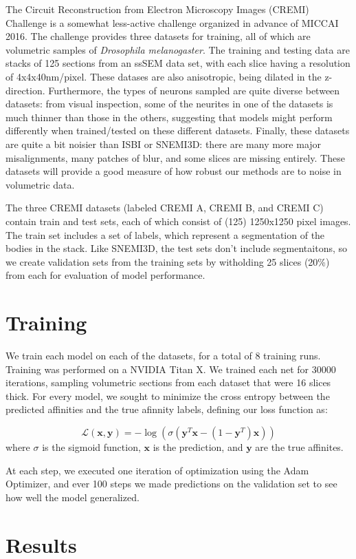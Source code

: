The Circuit Reconstruction from Electron Microscopy Images (CREMI) Challenge is a somewhat less-active challenge organized in advance of MICCAI 2016\cite{Funke.Jan2016}. The challenge provides three datasets for training, all of which are volumetric samples of \textit{Drosophila melanogaster}. The training and testing data are stacks of 125 sections from an ssSEM data set, with each slice having a resolution of 4x4x40nm/pixel. These datases are also anisotropic, being dilated in the z-direction. Furthermore, the types of neurons sampled are quite diverse between datasets: from visual inspection, some of the neurites in one of the datasets is much thinner than those in the others, suggesting that models might perform differently when trained/tested on these different datasets. Finally, these datasets are quite a bit noisier than ISBI or SNEMI3D: there are many more major misalignments, many patches of blur, and some slices are missing entirely. These datasets will provide a good measure of how robust our methods are to noise in volumetric data.

The three CREMI datasets (labeled CREMI A, CREMI B, and CREMI C) contain train and test sets, each of which consist of (125) 1250x1250 pixel images. The train set includes a set of labels, which represent a segmentation of the bodies in the stack. Like SNEMI3D, the test sets don't include segmentaitons, so we create validation sets from the training sets by witholding 25 slices (20\%) from each for evaluation of model performance.

\section{Training}

We train each model on each of the datasets, for a total of 8 training runs. Training was performed on a NVIDIA Titan X. We trained each net for 30000 iterations, sampling volumetric sections from each dataset that were 16 slices thick. For every model, we sought to minimize the cross entropy between the predicted affinities and the true afinnity labels, defining our loss function as:

$$\mathcal{L}(\bm{x}, \bm{y}) =-\log(\sigma(\bm{y}^{T}\bm{x}-(1-\bm{y}^{T})\bm{x}))$$
where $\sigma$ is the sigmoid function, $\bm{x}$ is the prediction, and $\bm{y}$ are the true affinites.

At each step, we executed one iteration of optimization using the Adam Optimizer, and ever 100 steps we made predictions on the validation set to see how well the model generalized.

\section{Results}
